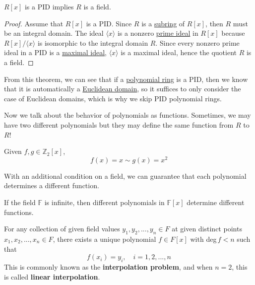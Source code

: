   \begin{theorem}
    \label{thm:pid-field}
    $R[x]$ is a PID implies $R$ is a field.
  \end{theorem}
  \begin{proof}
    Assume that $R[x]$ is a PID. Since $R$ is a \hyperref[def:subring]{subring} of $R[x]$, then $R$ must be an integral domain. The ideal $\langle x \rangle$ is a nonzero \hyperref[def:prime-ideal]{prime ideal} in $R[x]$ because $R[x]/\langle x \rangle$ is isomorphic to the integral domain $R$. Since every nonzero prime ideal in a PID is a \hyperref[def:maximal-ideal]{maximal ideal}, $\langle x \rangle$ is a maximal ideal, hence the quotient $R$ is a field. 
  \end{proof} 

  From this theorem, we can see that if a \hyperref[def:polynomial-ring]{polynomial ring} is a PID, then we know that it is automatically a \hyperref[def:euclidean-domain]{Euclidean domain}, so it suffices to only consider the case of Euclidean domains, which is why we skip PID polynomial rings. 

  Now we talk about the behavior of polynomials as functions. Sometimes, we may have two different polynomials but they may define the same function from $R$ to $R$! 

  \begin{example}
    \label{ex:polynomials-as-same-function}
    Given $f, g \in \mathbb{Z}_2 [x]$, 
    \begin{equation}
      f(x) = x \sim g(x) = x^2
    \end{equation} 
  \end{example} 

  With an additional condition on a field, we can guarantee that each polynomial determines a different function. 

  \begin{theorem}
    \label{thm:uniqueness-of-polynomials-over-field}
    If the field $\mathbb{F}$ is infinite, then different polynomials in $\mathbb{F}[x]$ determine different functions. 
  \end{theorem}

  \begin{theorem}[Interpolation]
    \label{thm:interpolation}
    For any collection of given field values $y_1, y_2, ..., y_n \in F$ at given distinct points $x_1, x_2, ..., x_n \in F$, there exists a unique polynomial $f \in F[x]$ with deg$\, f < n$ such that
    \begin{equation}
      f(x_i) = y_i, \quad i = 1, 2, ..., n
    \end{equation}
    This is commonly known as the \textbf{interpolation problem}, and when $n = 2$, this is called \textbf{linear interpolation}. 
  \end{theorem} 

